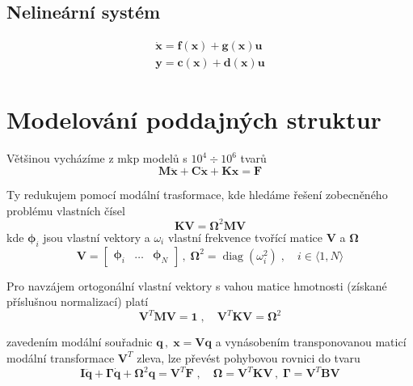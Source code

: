 \documentclass{article}
\begin{document}
	\subsection*{Nelineární systém}
	\begin{align}
		\bm{\dot{x}} = \bm{f}(\bm{x}) + \bm{g}(\bm{x})\bm{u} \\
		\bm{y} = \bm{c}(\bm{x}) + \bm{d}(\bm{x}) \bm{u}
	\end{align}
	
	\section{Modelování poddajných struktur}
	Většinou vycházíme z mkp modelů s $10^4 \div 10^6$ tvarů
	\begin{equation*}
		\bm{M}\bm{\ddot{x}} + \bm{C}\bm{\dot{x}} + \bm{K}\bm{x} = \bm{F}
	\end{equation*}

	Ty redukujem pomocí modální trasformace, kde hledáme řešení zobecněného problému vlastních čísel
	\begin{equation*}
		\bm{K}\bm{V} = \bm{\Omega}^2 \bm{M} \bm{V}
	\end{equation*}
	kde $\bm{\phi}_i$ jsou vlastní vektory a $\omega_i$ vlastní frekvence tvořící matice $\bm{V}$ a $\bm{\Omega}$  
	\begin{equation*}
		\bm{V} = \begin{bmatrix} \bm{\phi}_i & \dots & \bm{\phi}_N \end{bmatrix}
		\,,\;
		\bm{\Omega}^2 = \operatorname{diag}(\omega_i^2)
		\;,\quad 
		i \in \langle 1,N \rangle
	\end{equation*}

	Pro navzájem ortogonální vlastní vektory s vahou matice hmotnosti (získané příslušnou normalizací) platí
	\begin{equation*}
		\bm{V}^T\bm{M}\bm{V} = \bm{1}
		\;,\quad 
		\bm{V}^T\bm{K}\bm{V} = \bm{\Omega}^2
	\end{equation*}
	
	zavedením modální souřadnic $\bm{q} \,,\; \bm{x} = \bm{V}\bm{q}$ a vynásobením transponovanou maticí modální transformace $\bm{V}^T$ zleva, lze převést pohybovou rovnici do tvaru
	\begin{equation*}
		\bm{I}\bm{\ddot{q}} + \bm{\Gamma}\bm{\dot{q}} + \bm{\Omega}^2 \bm{q} = \bm{V}^T \bm{F}
		\;,\quad 
		\bm{\Omega} = \bm{V}^T\bm{K}\bm{V}
		\,,\;
		\bm{\Gamma} = \bm{V}^T\bm{B}\bm{V}
	\end{equation*}
\end{document}
